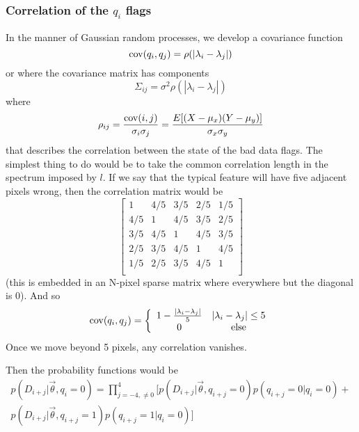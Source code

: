 \documentclass[preprint]{aastex} %
\newcommand{\vt}{\vec{\theta}}
\begin{document}
\subsubsection{Correlation of the $q_i$ flags}

In the manner of Gaussian random processes, we develop a covariance function
\begin{equation}
  {\rm cov}(q_i, q_j) = \rho(| \lambda_i - \lambda_j|)
\end{equation}
or where the covariance matrix has components
\begin{equation}
  \Sigma_{ij} = \sigma^2 \rho(|\lambda_i - \lambda_j|)
\end{equation}
where
\begin{equation}
  \rho_{ij} = \frac{ {\rm cov}(i,j)}{\sigma_i \sigma_j} = \frac{E[(X - \mu_x)(Y - \mu_y)]}{\sigma_x \sigma_y}
\end{equation}
that describes the correlation between the state of the bad data flags. The simplest thing to do would be to take the common correlation length in the spectrum imposed by $l$. If we say that the typical feature will have five adjacent pixels wrong, then the correlation matrix would be
\begin{equation}
  \begin{bmatrix}
    1 & 4/5 & 3/5 & 2/5 & 1/5 \\
    4/5 & 1 & 4/5 & 3/5 & 2/5 \\
    3/5 & 4/5 & 1 & 4/5 & 3/5 \\
    2/5 & 3/5 & 4/5 & 1 & 4/5 \\
    1/5 & 2/5 & 3/5 & 4/5 & 1\\
  \end{bmatrix}
\end{equation}
(this is embedded in an N-pixel sparse matrix where everywhere but the diagonal is 0). And so
\begin{equation}
  {\rm cov}(q_i, q_j) = \left \{ \begin{array}{cc}
    1 - \frac{|\lambda_i - \lambda_j|}{5} & |\lambda_i - \lambda_j| \leq 5 \\
    0                                    & \textrm{else}
\end{array}
\right .
\end{equation}
Once we move beyond 5 pixels, any correlation vanishes.


Then the probability functions would be
\begin{multline}
  p(D_{i + j} | \vt, q_i =0) = \prod_{j = -4, \ne 0}^4 \bigl [ p(D_{i+j} | \vt, q_{i +j}=0) p(q_{i+j} = 0 | q_i=0) + \\
    p(D_{i + j} | \vt, q_{i + j} = 1) p(q_{i +j} = 1 | q_i = 0) \bigr ]
\end{multline}
\end{document}
